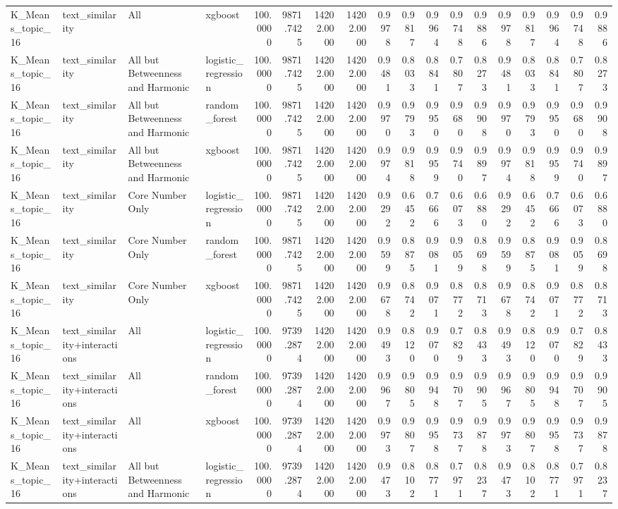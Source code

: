 \begin{tabular}{llllrrrrrrrrrrrrrr}
K_Means_topic_16 & text_similarity & All & xgboost & 100.0000 & 9871.7425 & 14202.0000 & 14202.0000 & 0.9978 & 0.9817 & 0.9964 & 0.9748 & 0.9886 & 0.9978 & 0.9817 & 0.9964 & 0.9748 & 0.9886 \\
K_Means_topic_16 & text_similarity & All but Betweenness and Harmonic & logistic_regression & 100.0000 & 9871.7425 & 14202.0000 & 14202.0000 & 0.9481 & 0.8033 & 0.8841 & 0.7807 & 0.8273 & 0.9481 & 0.8033 & 0.8841 & 0.7807 & 0.8273 \\
K_Means_topic_16 & text_similarity & All but Betweenness and Harmonic & random_forest & 100.0000 & 9871.7425 & 14202.0000 & 14202.0000 & 0.9970 & 0.9793 & 0.9950 & 0.9680 & 0.9908 & 0.9970 & 0.9793 & 0.9950 & 0.9680 & 0.9908 \\
K_Means_topic_16 & text_similarity & All but Betweenness and Harmonic & xgboost & 100.0000 & 9871.7425 & 14202.0000 & 14202.0000 & 0.9974 & 0.9818 & 0.9959 & 0.9740 & 0.9897 & 0.9974 & 0.9818 & 0.9959 & 0.9740 & 0.9897 \\
K_Means_topic_16 & text_similarity & Core Number Only & logistic_regression & 100.0000 & 9871.7425 & 14202.0000 & 14202.0000 & 0.9292 & 0.6452 & 0.7666 & 0.6073 & 0.6880 & 0.9292 & 0.6452 & 0.7666 & 0.6073 & 0.6880 \\
K_Means_topic_16 & text_similarity & Core Number Only & random_forest & 100.0000 & 9871.7425 & 14202.0000 & 14202.0000 & 0.9599 & 0.8875 & 0.9081 & 0.9059 & 0.8698 & 0.9599 & 0.8875 & 0.9081 & 0.9059 & 0.8698 \\
K_Means_topic_16 & text_similarity & Core Number Only & xgboost & 100.0000 & 9871.7425 & 14202.0000 & 14202.0000 & 0.9678 & 0.8742 & 0.9071 & 0.8772 & 0.8713 & 0.9678 & 0.8742 & 0.9071 & 0.8772 & 0.8713 \\
K_Means_topic_16 & text_similarity+interactions & All & logistic_regression & 100.0000 & 9739.2874 & 14202.0000 & 14202.0000 & 0.9493 & 0.8120 & 0.9070 & 0.7829 & 0.8433 & 0.9493 & 0.8120 & 0.9070 & 0.7829 & 0.8433 \\
K_Means_topic_16 & text_similarity+interactions & All & random_forest & 100.0000 & 9739.2874 & 14202.0000 & 14202.0000 & 0.9967 & 0.9805 & 0.9948 & 0.9707 & 0.9905 & 0.9967 & 0.9805 & 0.9948 & 0.9707 & 0.9905 \\
K_Means_topic_16 & text_similarity+interactions & All & xgboost & 100.0000 & 9739.2874 & 14202.0000 & 14202.0000 & 0.9973 & 0.9807 & 0.9958 & 0.9737 & 0.9878 & 0.9973 & 0.9807 & 0.9958 & 0.9737 & 0.9878 \\
K_Means_topic_16 & text_similarity+interactions & All but Betweenness and Harmonic & logistic_regression & 100.0000 & 9739.2874 & 14202.0000 & 14202.0000 & 0.9473 & 0.8102 & 0.8771 & 0.7971 & 0.8237 & 0.9473 & 0.8102 & 0.8771 & 0.7971 & 0.8237 \\

\end{tabular}
